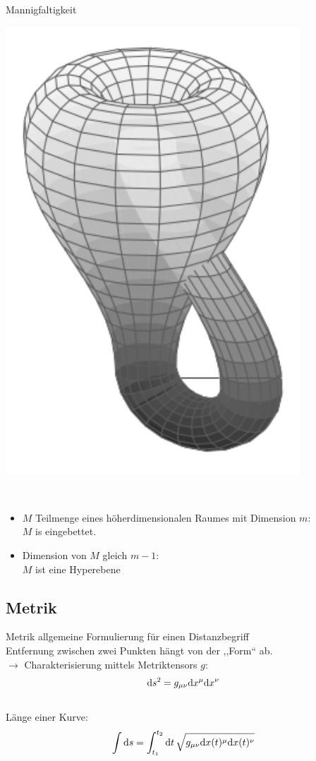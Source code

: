 \documentclass[mathserif]{beamer}
\theoremstyle{definition}
\begin{document}
\begin{frame}{Mannigfaltigkeit}
\begin{minipage}{0.45\linewidth}
			\centering
			\includegraphics[scale=0.3]{bottle.pdf}
		\end{minipage}\\
		\begin{itemize}
			\item $M$ Teilmenge eines h\"oherdimensionalen Raumes mit Dimension $m$:\\
			$M$ is eingebettet.\\
			\pause
			\item Dimension von $M$ gleich $m-1$:\\
			$M$ ist eine Hyperebene
		\end{itemize}
	\end{frame}
\subsection{Metrik}
	\begin{frame}{Metrik}
		allgemeine Formulierung für einen Distanzbegriff\\
		Entfernung zwischen zwei Punkten hängt von der ,,Form`` ab.\\
		\pause
		$\rightarrow$ Charakterisierung mittels Metriktensors $g$:
		\begin{align}
			{\rm d}s^2=g_{\mu\nu}{\rm d}x^\mu{\rm d}x^\nu
		\end{align}\\
		Länge einer Kurve:
		\begin{align}
			\int {\rm d}s=\int_{t_1}^{t_2}{\rm d}t\, \sqrt{g_{\mu\nu}{\rm d}x(t)^\mu{\rm d}x(t)^\nu}
		\end{align}
	\end{frame}
	
\end{document}
